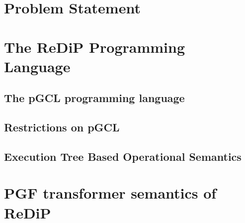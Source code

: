 \documentclass[a4paper]{article}
\begin{document}


\section{Problem Statement}

\section{The ReDiP Programming Language}

\subsection{The pGCL programming language}

\subsection{Restrictions on pGCL}

\subsection{Execution Tree Based Operational Semantics}

\section{PGF transformer semantics of ReDiP}
\end{document}
